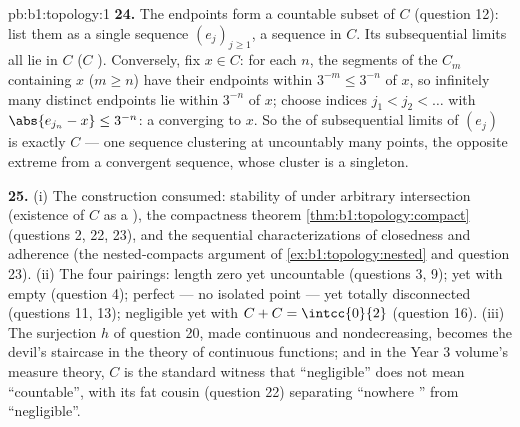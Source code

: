 \begin{solution}{pb:b1:topology:1}
\textbf{24.} The endpoints form a countable  subset of $C$
(question 12): list them as a single sequence $(e_j)_{j\geq1}$,
a sequence in $C$. Its subsequential limits all lie in $C$ ($C$
). Conversely, fix $x \in C$: for each $n$, the segments
of the $C_m$ containing $x$ ($m \geq n$) have their endpoints
within $3^{-m} \leq 3^{-n}$ of $x$, so infinitely many distinct
endpoints lie within $3^{-n}$ of $x$; choose indices $j_1 < j_2
< \dots$ with $\abs{e_{j_n} - x} \leq 3^{-n}$: a 
converging to $x$. So the  of subsequential limits of $(e_j)$
is exactly $C$ --- one sequence clustering at uncountably many
points, the opposite extreme from a convergent sequence, whose
cluster  is a singleton.

\textbf{25.} (i) The construction consumed: stability of  under arbitrary intersection (existence of $C$ as a ), the compactness theorem \cref{thm:b1:topology:compact}
(questions 2, 22, 23), and the sequential characterizations of
closedness and adherence (the nested-compacts argument of
\cref{ex:b1:topology:nested} and question 23). (ii) The four
pairings: length zero yet uncountable (questions 3, 9); 
yet with empty  (question 4); perfect --- no isolated
point --- yet totally disconnected (questions 11, 13);
negligible yet with $C + C = \intcc{0}{2}$ (question 16). (iii)
The surjection $h$ of question 20, made continuous and
nondecreasing, becomes the devil's staircase in the theory of
continuous functions; and in the Year 3 volume's measure theory,
$C$ is the standard witness that ``negligible'' does not mean
``countable'', with its fat cousin (question 22) separating
``nowhere '' from ``negligible''.
\end{solution}

